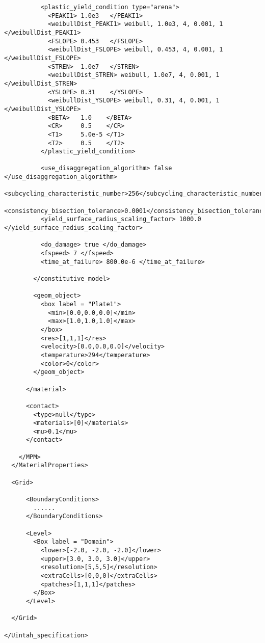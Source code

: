 \begin{lstlisting}
          <plastic_yield_condition type="arena">
            <PEAKI1> 1.0e3   </PEAKI1>
            <weibullDist_PEAKI1> weibull, 1.0e3, 4, 0.001, 1 </weibullDist_PEAKI1>
            <FSLOPE> 0.453   </FSLOPE>
            <weibullDist_FSLOPE> weibull, 0.453, 4, 0.001, 1 </weibullDist_FSLOPE>
            <STREN>  1.0e7   </STREN>
            <weibullDist_STREN> weibull, 1.0e7, 4, 0.001, 1 </weibullDist_STREN>
            <YSLOPE> 0.31    </YSLOPE>
            <weibullDist_YSLOPE> weibull, 0.31, 4, 0.001, 1 </weibullDist_YSLOPE>
            <BETA>   1.0    </BETA>
            <CR>     0.5    </CR>
            <T1>     5.0e-5 </T1>
            <T2>     0.5    </T2> 
          </plastic_yield_condition>

          <use_disaggregation_algorithm> false </use_disaggregation_algorithm>
          <subcycling_characteristic_number>256</subcycling_characteristic_number>
          <consistency_bisection_tolerance>0.0001</consistency_bisection_tolerance>
          <yield_surface_radius_scaling_factor> 1000.0 </yield_surface_radius_scaling_factor>

          <do_damage> true </do_damage>
          <fspeed> 7 </fspeed>
          <time_at_failure> 800.0e-6 </time_at_failure>

        </constitutive_model>

        <geom_object>
          <box label = "Plate1">
            <min>[0.0,0.0,0.0]</min>
            <max>[1.0,1.0,1.0]</max>
          </box>
          <res>[1,1,1]</res>
          <velocity>[0.0,0.0,0.0]</velocity>
          <temperature>294</temperature>
          <color>0</color>
        </geom_object>

      </material>

      <contact>
        <type>null</type>
        <materials>[0]</materials>
        <mu>0.1</mu>
      </contact>

    </MPM>
  </MaterialProperties>

  <Grid>

      <BoundaryConditions>                      
        ......
      </BoundaryConditions>

      <Level>
        <Box label = "Domain">
          <lower>[-2.0, -2.0, -2.0]</lower>
          <upper>[3.0, 3.0, 3.0]</upper>
          <resolution>[5,5,5]</resolution>
          <extraCells>[0,0,0]</extraCells>
          <patches>[1,1,1]</patches>
        </Box>
      </Level>

  </Grid>

</Uintah_specification>
\end{lstlisting}

